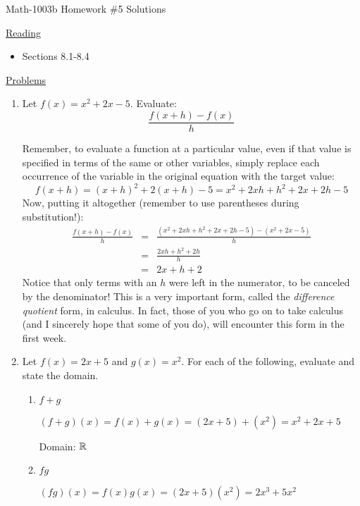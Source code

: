 \documentclass[letterpaper,12pt,fleqn]{article}
\begin{document}
\begin{center}
\Large Math-1003b Homework \#5 Solutions
\end{center}

\vspace{0.5in}

\underline{Reading}

\bigskip

\begin{itemize}
\item Sections 8.1-8.4
\end{itemize}

\bigskip

\underline{Problems}

\bigskip

\begin{enumerate}
\item Let $f(x)=x^2+2x-5$. Evaluate:
  \[\frac{f(x+h)-f(x)}{h}\]

  Remember, to evaluate a function at a particular value, even if that value is
  specified in terms of the same or other variables, simply replace each
  occurrence of the variable in the original equation with the target value:
  \[f(x+h)=(x+h)^2+2(x+h)-5=x^2+2xh+h^2+2x+2h-5\]
  Now, putting it altogether (remember to use parentheses during substitution!):
  \begin{eqnarray*}
    \frac{f(x+h)-f(x)}{h} &=& \frac{(x^2+2xh+h^2+2x+2h-5)-(x^2+2x-5)}{h} \\
    &=& \frac{2xh+h^2+2h}{h} \\
    &=& 2x+h+2
  \end{eqnarray*}
  Notice that only terms with an $h$ were left in the numerator, to be canceled
  by the denominator! This is a very important form, called the
  \emph{difference quotient} form, in calculus. In fact, those of you who go on
  to take calculus (and I sincerely hope that some of you do), will encounter
  this form in the first week.

\item Let $f(x)=2x+5$ and $g(x)=x^2$. For each of the following,
  evaluate and state the domain.
  \begin{enumerate}
  \item $f+g$
    
    $(f+g)(x)=f(x)+g(x)=(2x+5)+(x^2)=x^2+2x+5$

    Domain: $\mathbb{R}$
    
  \item $fg$

    $(fg)(x)=f(x)g(x)=(2x+5)(x^2)=2x^3+5x^2$
    

\end{enumerate}
\end{enumerate}
\end{document}
